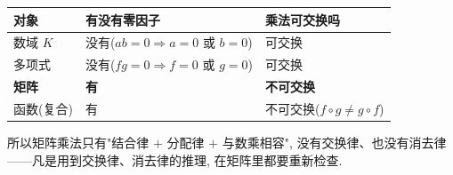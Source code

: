 \documentclass[UTF8,11pt]{ctexart}
\theoremstyle{cnthm}
\begin{document}
\begin{center}
\begin{tabular}{lll}
\hline
对象 & 有没有零因子 & 乘法可交换吗\\
\hline
数域 $K$ & 没有($ab=0\Rightarrow a=0$ 或 $b=0$) & 可交换\\
多项式 & 没有($fg=0\Rightarrow f=0$ 或 $g=0$) & 可交换\\
\textbf{矩阵} & \textbf{有} & \textbf{不可交换}\\
函数(复合) & 有 & 不可交换($f\circ g\neq g\circ f$)\\
\hline
\end{tabular}
\end{center}

所以矩阵乘法只有"结合律 $+$ 分配律 $+$ 与数乘相容", 没有交换律、也没有消去律——凡是用到交换律、消去律的推理, 在矩阵里都要重新检查.
\end{document}
